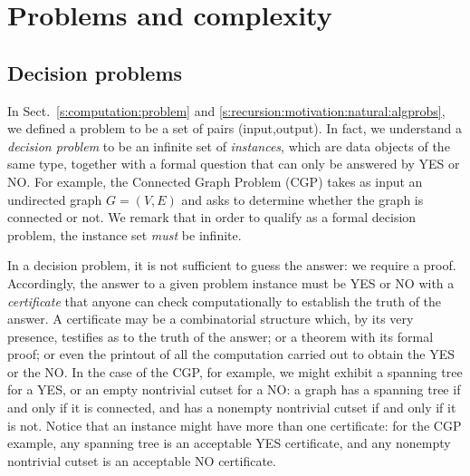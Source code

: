 \documentclass[a4paper]{book}
\theoremstyle{changebreak}                %
\begin{document}
\chapter{Problems and complexity}
\label{c:problem}

\begin{center}
\end{center}

\section{Decision problems}
\label{s:problem:decision}
In Sect.~\ref{s:computation:problem} and
\ref{s:recursion:motivation:natural:algprobs}, we defined a problem to
be a set of pairs (input,output). In fact,
we understand a {\it decision
  problem} to be an
infinite set of {\it instances}, which
are data objects of the same type,
 together with a formal question
that can only be answered by YES or NO. For example, the {\sc
  Connected Graph Problem} (CGP) takes as input
an undirected graph $G=(V,E)$ and asks to determine whether the graph
is connected or not. We remark that in order to qualify as a formal
decision problem, the instance set {\it must} be infinite.

In a decision problem, it is not sufficient to guess the answer: we
require a proof. Accordingly, the answer to a given problem
instance must be YES or NO with a {\it
  certificate} that anyone can check
computationally to establish the truth of the answer. A certificate
may be a combinatorial structure which, by its very presence,
testifies as to the truth of the answer; or a theorem with its formal
proof; or even the printout of all the computation carried out to
obtain the YES or the NO. In the case of the CGP, for example, we
might exhibit a spanning tree for a YES, or an
empty nontrivial cutset for a NO: a
graph has a spanning tree if and only if it is connected, and has a
nonempty nontrivial cutset if and only if it is not. Notice that an
instance might have more than one certificate: for the CGP example,
any spanning tree is an acceptable YES certificate, and any nonempty
nontrivial cutset is an acceptable NO certificate.
\end{document}
